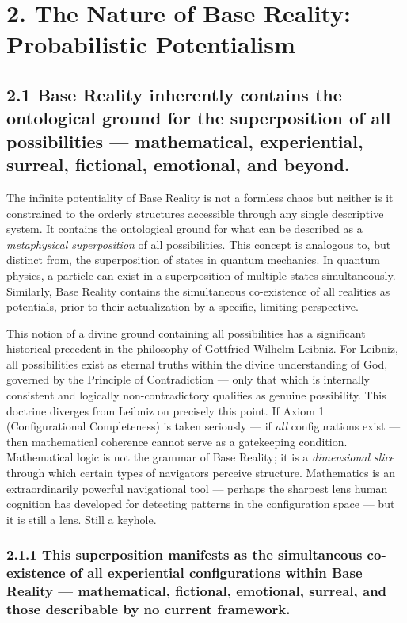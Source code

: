 \bigskip\noindent\makebox[\textwidth]{\color{rulegray}\rule{5cm}{0.3pt}}\bigskip


\section*{2. The Nature of Base Reality: Probabilistic Potentialism}


\subsection*{2.1 Base Reality inherently contains the ontological ground for the superposition of all possibilities — mathematical, experiential, surreal, fictional, emotional, and beyond.}


The infinite potentiality of Base Reality is not a formless chaos but neither is it constrained to the orderly structures accessible through any single descriptive system. It contains the ontological ground for what can be described as a \textit{metaphysical superposition} of all possibilities. This concept is analogous to, but distinct from, the superposition of states in quantum mechanics. In quantum physics, a particle can exist in a superposition of multiple states simultaneously. Similarly, Base Reality contains the simultaneous co-existence of all realities as potentials, prior to their actualization by a specific, limiting perspective.


This notion of a divine ground containing all possibilities has a significant historical precedent in the philosophy of Gottfried Wilhelm Leibniz. For Leibniz, all possibilities exist as eternal truths within the divine understanding of God, governed by the Principle of Contradiction — only that which is internally consistent and logically non-contradictory qualifies as genuine possibility. This doctrine diverges from Leibniz on precisely this point. If Axiom 1 (Configurational Completeness) is taken seriously — if \textit{all} configurations exist — then mathematical coherence cannot serve as a gatekeeping condition. Mathematical logic is not the grammar of Base Reality; it is a \textit{dimensional slice} through which certain types of navigators perceive structure. Mathematics is an extraordinarily powerful navigational tool — perhaps the sharpest lens human cognition has developed for detecting patterns in the configuration space — but it is still a lens. Still a keyhole.


\subsubsection*{2.1.1 This superposition manifests as the simultaneous co-existence of all experiential configurations within Base Reality — mathematical, fictional, emotional, surreal, and those describable by no current framework.}


